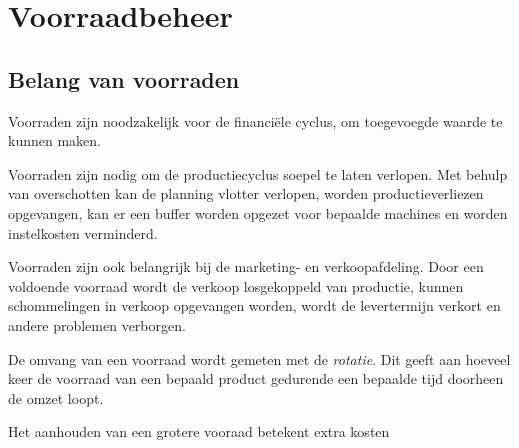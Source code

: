 \documentclass[../../samenvatting.tex]{subfiles}
\begin{document}
\section{Voorraadbeheer}
\subsection{Belang van voorraden}

Voorraden zijn noodzakelijk voor de financiële cyclus, om toegevoegde waarde te kunnen maken. 

Voorraden zijn nodig om de productiecyclus soepel te laten verlopen. Met behulp van overschotten kan de planning vlotter verlopen, worden productieverliezen opgevangen, kan er een buffer worden opgezet voor bepaalde machines en worden instelkosten verminderd.

Voorraden zijn ook belangrijk bij de marketing- en verkoopafdeling. Door een voldoende voorraad wordt de verkoop losgekoppeld van productie, kunnen schommelingen in verkoop opgevangen worden, wordt de levertermijn verkort en andere problemen verborgen.

De omvang van een voorraad wordt gemeten met de \emph{rotatie}. Dit geeft aan hoeveel keer de voorraad van een bepaald product gedurende een bepaalde tijd doorheen de omzet loopt.

Het aanhouden van een grotere vooraad betekent extra kosten
\end{document}
